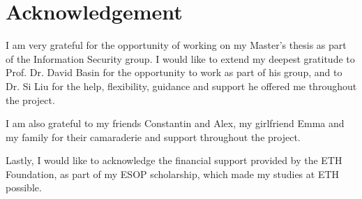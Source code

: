 \newpage


\section*{Acknowledgement}
I am very grateful for the opportunity of working on my Master's thesis as part of the Information Security group. I would like to extend my deepest gratitude to Prof. Dr. David Basin for the opportunity to work as part of his group, and to Dr. Si Liu for the help, flexibility, guidance and support he offered me throughout the project.  

I am also grateful to my friends Constantin and Alex, my girlfriend Emma and my family for their camaraderie and support throughout the project.

Lastly, I would like to acknowledge the financial support provided by the ETH Foundation, as part of my ESOP scholarship, which made my studies at ETH possible.








